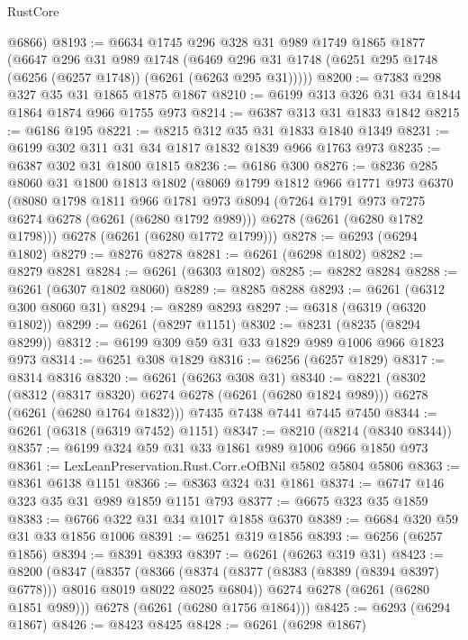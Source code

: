 \begin{lexlean}{RustCore}
\begin{coremodule}
      @6866)
@8193 := @6634
    @1745
    @296
    @328
    @31
    @989
    @1749
    @1865
    @1877
    (@6647
      @296
      @31
      @989
      @1748
      (@6469 @296 @31 @1748 (@6251 @295 @1748 (@6256 (@6257 @1748)) (@6261 (@6263 @295 @31)))))
@8200 := @7383 @298 @327 @35 @31 @1865 @1875 @1867
@8210 := @6199 @313 @326 @31 @34 @1844 @1864 @1874 @966 @1755 @973
@8214 := @6387 @313 @31 @1833 @1842
@8215 := @6186 @195
@8221 := @8215 @312 @35 @31 @1833 @1840 @1349
@8231 := @6199 @302 @311 @31 @34 @1817 @1832 @1839 @966 @1763 @973
@8235 := @6387 @302 @31 @1800 @1815
@8236 := @6186 @300
@8276 := @8236
    @285
    @8060
    @31
    @1800
    @1813
    @1802
    (@8069
      @1799
      @1812
      @966
      @1771
      @973
      @6370
      (@8080
        @1798
        @1811
        @966
        @1781
        @973
        @8094
        (@7264 @1791 @973 @7275 @6274 @6278 (@6261 (@6280 @1792 @989)))
        @6278
        (@6261 (@6280 @1782 @1798)))
      @6278
      (@6261 (@6280 @1772 @1799)))
@8278 := @6293 (@6294 @1802)
@8279 := @8276 @8278
@8281 := @6261 (@6298 @1802)
@8282 := @8279 @8281
@8284 := @6261 (@6303 @1802)
@8285 := @8282 @8284
@8288 := @6261 (@6307 @1802 @8060)
@8289 := @8285 @8288
@8293 := @6261 (@6312 @300 @8060 @31)
@8294 := @8289 @8293
@8297 := @6318 (@6319 (@6320 @1802))
@8299 := @6261 (@8297 @1151)
@8302 := @8231 (@8235 (@8294 @8299))
@8312 := @6199 @309 @59 @31 @33 @1829 @989 @1006 @966 @1823 @973
@8314 := @6251 @308 @1829
@8316 := @6256 (@6257 @1829)
@8317 := @8314 @8316
@8320 := @6261 (@6263 @308 @31)
@8340 := @8221
    (@8302
      (@8312 (@8317 @8320) @6274 @6278 (@6261 (@6280 @1824 @989)))
      @6278
      (@6261 (@6280 @1764 @1832)))
    @7435
    @7438
    @7441
    @7445
    @7450
@8344 := @6261 (@6318 (@6319 @7452) @1151)
@8347 := @8210 (@8214 (@8340 @8344))
@8357 := @6199 @324 @59 @31 @33 @1861 @989 @1006 @966 @1850 @973
@8361 := LexLeanPreservation.Rust.Corr.eOfBNil @5802 @5804 @5806
@8363 := @8361 @6138 @1151
@8366 := @8363 @324 @31 @1861
@8374 := @6747 @146 @323 @35 @31 @989 @1859 @1151 @793
@8377 := @6675 @323 @35 @1859
@8383 := @6766 @322 @31 @34 @1017 @1858 @6370
@8389 := @6684 @320 @59 @31 @33 @1856 @1006
@8391 := @6251 @319 @1856
@8393 := @6256 (@6257 @1856)
@8394 := @8391 @8393
@8397 := @6261 (@6263 @319 @31)
@8423 := @8200
    (@8347
      (@8357
        (@8366 (@8374 (@8377 (@8383 (@8389 (@8394 @8397) @6778))) @8016 @8019 @8022 @8025 @6804))
        @6274
        @6278
        (@6261 (@6280 @1851 @989)))
      @6278
      (@6261 (@6280 @1756 @1864)))
@8425 := @6293 (@6294 @1867)
@8426 := @8423 @8425
@8428 := @6261 (@6298 @1867)

\end{coremodule}
\end{lexlean}
